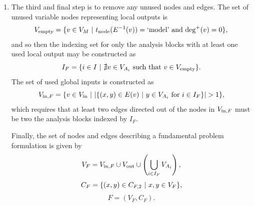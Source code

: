 \begin{enumerate}
\item The third and final step is to remove any unused nodes and edges. The set of unused variable nodes representing local outputs is
\begin{equation}
V_\textrm{empty} = \{v \in V_M \ | \  t_\textrm{node}(E^{-1}(v))=\textrm{`model'} \textrm{ and } \textrm{deg}^+(v) = 0\},
\end{equation}
and so then the indexing set for only the analysis blocks with at least one used local output may be constructed as
\begin{equation}
I_F =  \{i \in I \ | \ \nexists v \in V_{A_i} \textrm{ such that }  v \in V_\textrm{empty} \}.
\end{equation}
The set of used global inputs is constructed as
\begin{equation}
V_{\textrm{in},F} = \{v \in V_\textrm{in} \ | \  |\{(x,y) \in E(v) \ | \  y \in V_{A_i} \textrm{ for } i \in I_F  \}| > 1\},
\end{equation}
which requires that at least two edges directed out of the nodes in $V_{\textrm{in},F}$ must be two the analysis blocks indexed by $I_F$.

Finally, the set of nodes and edges describing a fundamental problem formulation is given by
\begin{equation}
V_F = V_{\textrm{in},F} \cup V_\textrm{out} \cup \left( \bigcup_{i \in I_F} V_{A_i} \right),
\end{equation}
\begin{equation}
C_{F} = \{ (x,y) \in C_{F,2} \ | \  x,y \in V_F\},
\end{equation}
\begin{equation}
F = (V_F,C_F).
\end{equation}





\end{enumerate}



